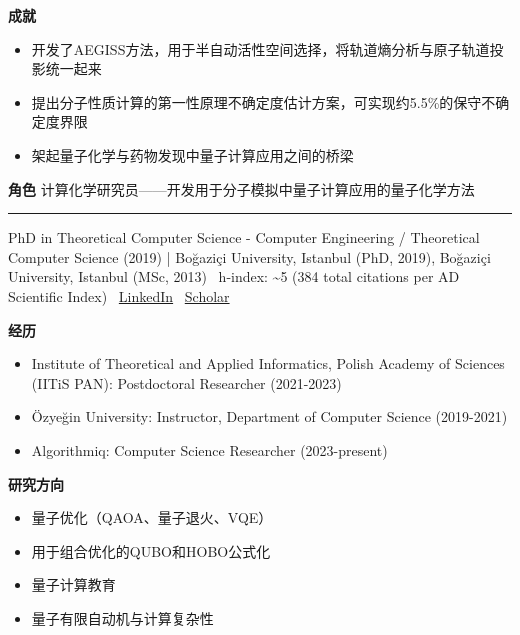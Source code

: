 \par{\footnotesize\color{mainred}\textbf{成就}}
\begin{itemize}[leftmargin=1.2em,itemsep=0pt,topsep=0pt]
\item {\footnotesize 开发了AEGISS方法，用于半自动活性空间选择，将轨道熵分析与原子轨道投影统一起来}
\item {\footnotesize 提出分子性质计算的第一性原理不确定度估计方案，可实现约5.5\%的保守不确定度界限}
\item {\footnotesize 架起量子化学与药物发现中量子计算应用之间的桥梁}
\end{itemize}
\par{\footnotesize\color{mainred}\textbf{角色}} {\footnotesize 计算化学研究员——开发用于分子模拟中量子计算应用的量子化学方法}
\vspace{2pt}\hrule\vspace{2pt}
\vspace{4pt}
\par{\footnotesize\color{graytext}PhD in Theoretical Computer Science - Computer Engineering / Theoretical Computer Science (2019) | Boğaziçi University, Istanbul (PhD, 2019), Boğaziçi University, Istanbul (MSc, 2013) \textbar\  h-index: \textasciitilde{}5 (384 total citations per AD Scientific Index) \textbar\  \href{https://www.linkedin.com/in/ozlem-salehi/}{LinkedIn} \textbar\  \href{https://ieeexplore.ieee.org/author/37088516883}{Scholar}}
\par{\footnotesize\color{mainred}\textbf{经历}}
\begin{itemize}[leftmargin=1.2em,itemsep=0pt,topsep=0pt]
\item {\footnotesize Institute of Theoretical and Applied Informatics, Polish Academy of Sciences (IITiS PAN): Postdoctoral Researcher (2021-2023)}
\item {\footnotesize Özyeğin University: Instructor, Department of Computer Science (2019-2021)}
\item {\footnotesize Algorithmiq: Computer Science Researcher (2023-present)}
\end{itemize}
\par{\footnotesize\color{mainred}\textbf{研究方向}}
\begin{itemize}[leftmargin=1.2em,itemsep=0pt,topsep=0pt]
\item {\footnotesize 量子优化（QAOA、量子退火、VQE）}
\item {\footnotesize 用于组合优化的QUBO和HOBO公式化}
\item {\footnotesize 量子计算教育}
\item {\footnotesize 量子有限自动机与计算复杂性}
\end{itemize}
